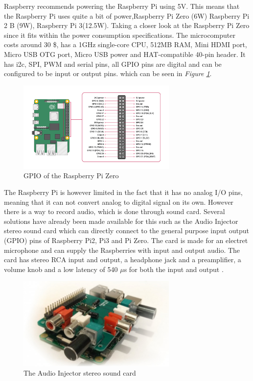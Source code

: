 Raspberry recommends powering the Raspberry Pi using 5V.
This means that the Raspberry Pi uses quite a bit of power,Raspberry Pi Zero (6W) Raspberry Pi 2 B (9W), Raspberry Pi 3(12.5W).
Taking a closer look at the Raspberry Pi Zero since it fits within the power consumption specifications.
The microcomputer costs around 30 \$, has a 1GHz single-core CPU, 512MB RAM, Mini HDMI port, Micro USB OTG port,
Micro USB power and HAT-compatible 40-pin header.
It has i2c, SPI, PWM and serial pins, all GPIO pins are digital and can be configured to be input or output pins.
which can be seen in \textit{Figure \ref{fig:RPIGPIO}}.

\begin{figure}[h]
    \centering
    \includegraphics[width=0.70\textwidth]{graphics/ZeroGPIO.png}
    \caption{GPIO of the Raspberry Pi Zero \cite{noauthor_gpio_nodate}}
    \label{fig:RPIGPIO}
\end{figure}

The Raspberry Pi is however limited in the fact that it has no analog I/O pins, meaning that it can not convert analog to digital signal on its own.
However there is a way to record audio, which is done through sound card.
Several solutions have already been made available for this such as the Audio Injector stereo sound card which can directly connect to the general purpose input output (GPIO) pins of Raspberry Pi2, Pi3 and Pi Zero.
The card is made for an electret microphone and can supply the Raspberries with input and output audio.
The card has stereo RCA input and output, a headphone jack and a preamplifier, a volume knob and a low latency of 540 $\mu$s for both the input and output \cite{noauthor_rpi_nodate}.

\begin{figure}[h]
    \centering
    \includegraphics[width=0.70\textwidth]{graphics/rpisoundcard.jpg}
    \caption{The Audio Injector stereo sound card \cite{noauthor_rpi_nodate}}
    \label{fig:rpisoundcard}
\end{figure}


